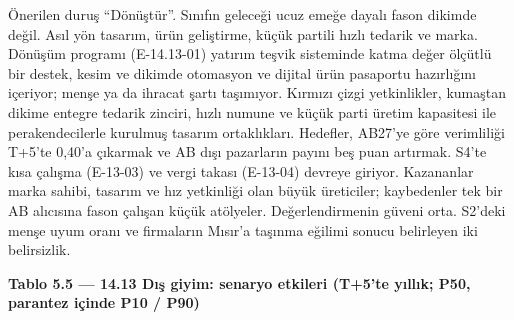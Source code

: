 Önerilen duruş ``Dönüştür''. Sınıfın geleceği ucuz emeğe dayalı fason dikimde değil. Asıl yön tasarım, ürün geliştirme, küçük partili hızlı tedarik ve marka. Dönüşüm programı (E-14.13-01) yatırım teşvik sisteminde katma değer ölçütlü bir destek, kesim ve dikimde otomasyon ve dijital ürün pasaportu hazırlığını içeriyor; menşe ya da ihracat şartı taşımıyor. Kırmızı çizgi yetkinlikler, kumaştan dikime entegre tedarik zinciri, hızlı numune ve küçük parti üretim kapasitesi ile perakendecilerle kurulmuş tasarım ortaklıkları. Hedefler, AB27'ye göre verimliliği T+5'te 0,40'a çıkarmak ve AB dışı pazarların payını beş puan artırmak. S4'te kısa çalışma (E-13-03) ve vergi takası (E-13-04) devreye giriyor. Kazananlar marka sahibi, tasarım ve hız yetkinliği olan büyük üreticiler; kaybedenler tek bir AB alıcısına fason çalışan küçük atölyeler. Değerlendirmenin güveni orta. S2'deki menşe uyum oranı \etiketH{} ve firmaların Mısır'a taşınma eğilimi sonucu belirleyen iki belirsizlik.


\textbf{Tablo 5.5 --- 14.13 Dış giyim: senaryo etkileri (T+5'te yıllık; P50, parantez içinde P10 / P90)}

\nopagebreak[4]

\begingroup\gbtablo\small

